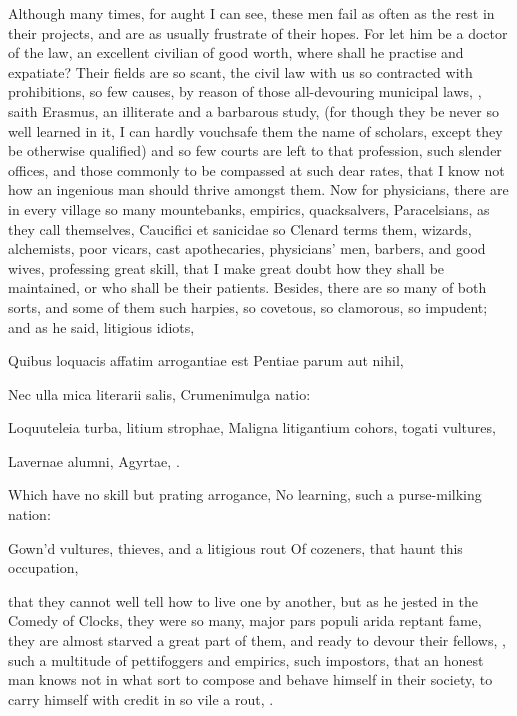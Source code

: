 {{Although many times, for aught I can see, these men fail as often as
the rest in their projects, and are as usually frustrate of their
hopes. For let him be a doctor of the law, an excellent civilian of
good worth, where shall he practise and expatiate? Their fields are so
scant, the civil law with us so contracted with prohibitions, so few
causes, by reason of those all-devouring municipal laws, , saith Erasmus, an illiterate and a barbarous
study, (for though they be never so well learned in it, I can hardly
vouchsafe them the name of scholars, except they be otherwise
qualified) and so few courts are left to that profession, such slender
offices, and those commonly to be compassed at such dear rates, that I
know not how an ingenious man should thrive amongst them. Now for
physicians, there are in every village so many mountebanks, empirics,
quacksalvers, Paracelsians, as they call themselves, Caucifici et
sanicidae so Clenard terms them, wizards, alchemists, poor
vicars, cast apothecaries, physicians' men, barbers, and good wives,
professing great skill, that I make great doubt how they shall be
maintained, or who shall be their patients. Besides, there are so many
of both sorts, and some of them such harpies, so covetous, so
clamorous, so impudent; and as he said, litigious idiots,

\begin{latin}
Quibus loquacis affatim arrogantiae est
Pentiae parum aut nihil,

Nec ulla mica literarii salis,
Crumenimulga natio:

Loquuteleia turba, litium strophae,
Maligna litigantium cohors, togati vultures,

Lavernae alumni, Agyrtae, \etc{}.%
\end{latin}

Which have no skill but prating arrogance,
No learning, such a purse-milking nation:

Gown'd vultures, thieves, and a litigious rout
Of cozeners, that haunt this occupation,

that they cannot well tell how to live one by another, but as he jested
in the Comedy of Clocks, they were so many, major pars populi
arida reptant fame, they are almost starved a great part of them, and
ready to devour their fellows, ,
such a multitude of pettifoggers and empirics, such impostors, that an
honest man knows not in what sort to compose and behave himself in
their society, to carry himself with credit in so vile a rout,
.

}}
